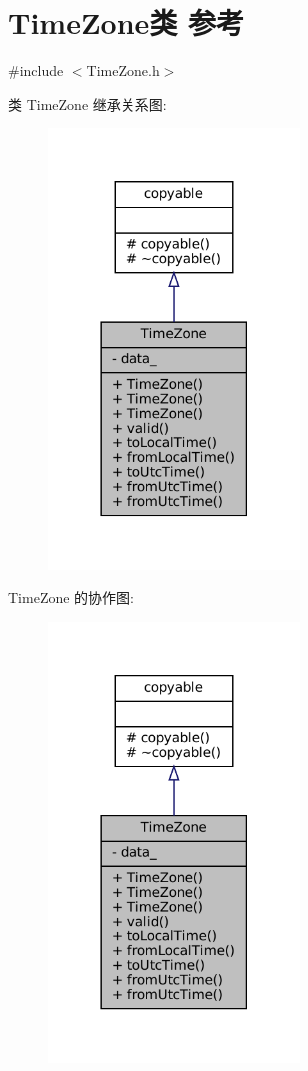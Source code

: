 \hypertarget{classmuduo_1_1TimeZone}{}\section{Time\+Zone类 参考}
\label{classmuduo_1_1TimeZone}


{\ttfamily \#include $<$Time\+Zone.\+h$>$}



类 Time\+Zone 继承关系图\+:
\nopagebreak
\begin{figure}[H]
\begin{center}
\leavevmode
\includegraphics[width=189pt]{classmuduo_1_1TimeZone__inherit__graph}
\end{center}
\end{figure}


Time\+Zone 的协作图\+:
\nopagebreak
\begin{figure}[H]
\begin{center}
\leavevmode
\includegraphics[width=189pt]{classmuduo_1_1TimeZone__coll__graph}
\end{center}
\end{figure}
